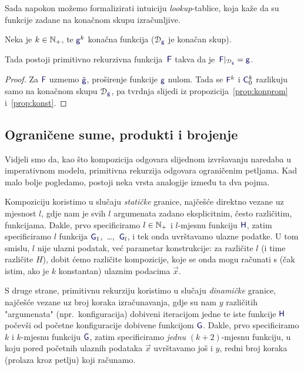 Sada napokon možemo formalizirati intuiciju \emph{lookup}-tablice, koja kaže da su funkcije zadane na konačnom skupu izračunljive. %

\begin{korolar}\label{kor:kon0}
Neka je $k\in{\mathbb N}_+$, te $\f g^k$ konačna funkcija ($\dom{\f g}$ je konačan skup).
   
    Tada postoji primitivno rekurzivna funkcija\, $\f F$ takva da je\, $\f F|_{\dom{\f g}}=\f g$.
\end{korolar}
\begin{proof}
    Za $\f F$ uzmemo $\tilde{\f g}$, proširenje funkcije $\f g$ nulom. Tada se $\f F^k$ i $\f C_0^k$ razlikuju samo na konačnom skupu $\dom{\f g}$, pa tvrdnja slijedi iz propozicija~\ref{prop:konprom} i~\ref{prop:konst}. 
\end{proof}

\subsection{Ograničene sume, produkti i brojenje}\label{sec:sumprodcount}

Vidjeli smo da, kao što kompozicija odgovara slijednom izvršavanju naredaba u imperativnom modelu, primitivna rekurzija odgovara ograničenim petljama. Kad malo bolje pogledamo, postoji neka vrsta analogije između ta dva pojma.

Kompoziciju koristimo u slučaju \emph{statičke} granice, najčešće direktno vezane uz mjesnost $l$, gdje nam je svih $l$ argumenata zadano eksplicitnim, često različitim, funkcijama. Dakle, prvo specificiramo $l\in{\mathbb N}_+$ i $l$-mjesnu funkciju $\f H$, zatim specificiramo $l$ funkcija $\f G_1$,~\ldots,~$\f G_l$, i tek onda uvrštavamo ulazne podatke. U tom smislu, $l$ nije ulazni podatak, već parametar konstrukcije: za različite $l$ (i time različite $H$), dobit ćemo različite kompozicije, koje se onda mogu računati s (čak istim, ako je $k$ konstantan) ulaznim podacima $\vec x$.

S druge strane, primitivnu rekurziju koristimo u slučaju \emph{dinamičke} granice, naj\-češ\-će vezane uz broj koraka izračunavanja, gdje su nam $y$ različitih "argumenata" (npr.\ konfiguracija) dobiveni iteracijom jedne te iste funkcije $\f H$ počevši od početne konfiguracije dobivene funkcijom $\f G$. Dakle, prvo specificiramo $k$ i $k$-mjesnu funkciju $\f G$, zatim specificiramo \emph{jednu} $(k+2)$-mjesnu funkciju, u koju pored početnih ulaznih podataka $\vec x$ uvrštavamo još i $y$, redni broj koraka (prolaza kroz petlju) koji računamo.

